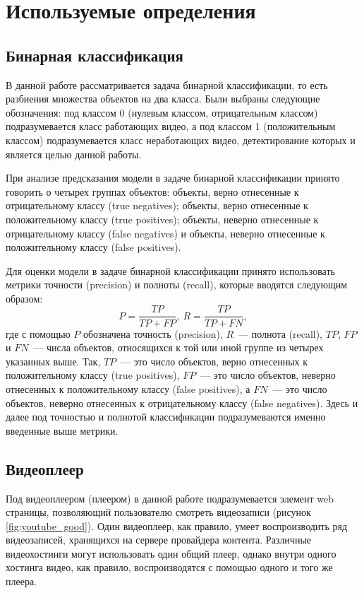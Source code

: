 \chapter{Используемые определения}

\section{Бинарная классификация}

В данной работе рассматривается задача бинарной классификации, то есть разбиения множества объектов на два класса. Были выбраны следующие обозначения: под классом 0 (нулевым классом, отрицательным классом) подразумевается класс работающих видео, а под классом 1 (положительным классом) подразумевается класс неработающих видео, детектирование которых и является целью данной работы.

При анализе предсказания модели в задаче бинарной классификации принято говорить о четырех группах объектов: объекты, верно отнесенные к отрицательному классу (true negatives); объекты, верно отнесенные к положительному классу (true positives); объекты, неверно отнесенные к отрицательному классу (false negatives) и объекты, неверно отнесенные к положительному классу (false positives).

Для оценки модели в задаче бинарной классификации принято использовать метрики точности (precision) и полноты (recall), которые вводятся следующим образом:
\[
    P = \frac{TP}{TP + FP},\ R = \frac{TP}{TP + FN},
\]
где с помощью $P$ обозначена точность (precision), $R$~--- полнота (recall), $TP$, $FP$ и $FN$~--- числа объектов, относящихся к той или иной группе из четырех указанных выше. Так, $TP$~--- это число объектов, верно отнесенных к положительному классу (true positives), $FP$~--- это число объектов, неверно отнесенных к положительному классу (false positives), а $FN$~--- это число объектов, неверно отнесенных к отрицательному классу (false negatives). Здесь и далее под точностью и полнотой классификации подразумеваются именно введенные выше метрики.

\section{Видеоплеер}

Под видеоплеером (плеером) в данной работе подразумевается элемент web страницы, позволяющий пользователю смотреть видеозаписи (рисунок \ref{fig:youtube_good}). Один видеоплеер, как правило, умеет воспроизводить ряд видеозаписей, хранящихся на сервере провайдера контента. Различные видеохостинги могут использовать один общий плеер, однако внутри одного хостинга видео, как правило, воспроизводятся с помощью одного и того же плеера.

